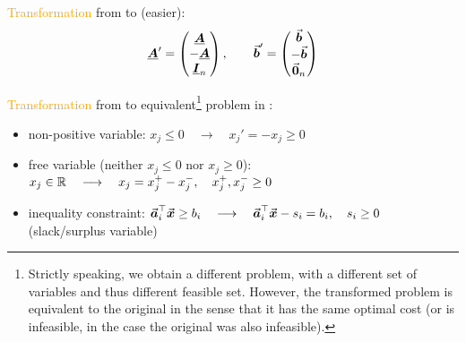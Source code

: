 \textcolor{orange}{Transformation} from  to  (easier):
\[
\underline{\boldsymbol{A}}' = \begin{pmatrix}
  \underline{\boldsymbol{A}} \\
  -\underline{\boldsymbol{A}} \\
  \underline{\boldsymbol{I}}_{n}
\end{pmatrix},
\qquad
\vec{\boldsymbol{b}}' = \begin{pmatrix}
  \vec{\boldsymbol{b}} \\
  -\vec{\boldsymbol{b}} \\
  \vec{\boldsymbol{0}}_{n}
\end{pmatrix}
\]


\textcolor{orange}{Transformation} from  to equivalent\footnote{Strictly speaking, we obtain a different problem, with a different set of variables and thus different feasible set. However, the transformed problem is equivalent to the original in the sense that it has the same optimal cost (or is infeasible, in the case the original was also infeasible).} problem in :
\begin{itemize}
\item non-positive variable: \(x_j \leq 0 \quad \longrightarrow \quad x_j' = -x_j \geq 0\)
\item free variable (neither \(x_j \leq 0\) nor \(x_j \geq 0\)): \(x_j \in \mathbb{R} \quad \longrightarrow \quad x_j = x_j^+ - x_j^-, \quad x_j^+, x_j^- \geq 0\)
\item inequality constraint: \(\vec{\boldsymbol{a}}_i^\top \vec{\boldsymbol{x}} \geq b_i \quad \longrightarrow \quad \vec{\boldsymbol{a}}_i^\top \vec{\boldsymbol{x}} - s_i = b_i, \quad s_i \geq 0\) (slack/surplus variable)
\end{itemize}


